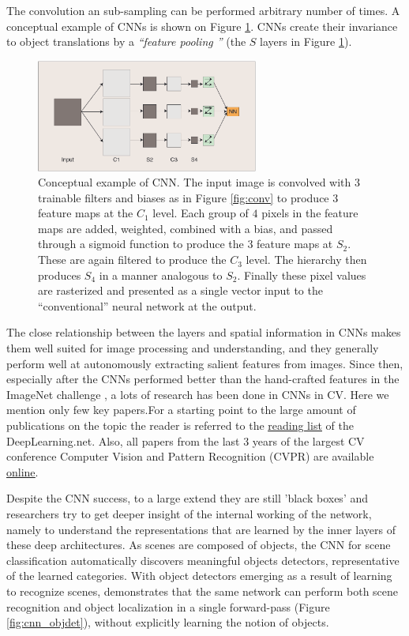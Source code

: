 The convolution an sub-sampling can be performed arbitrary number of times. A conceptual example of CNNs is shown on Figure \ref{fig:cnn}. CNNs create their invariance to object translations by a {\em ``feature pooling ''} (the $S$ layers in Figure \ref{fig:cnn}). 

\begin{figure}[H]
\begin{center}
\includegraphics[width=0.65\textwidth]{fig/cnn}
\end{center}
\caption{Conceptual example of CNN. The input image is convolved with $3$ trainable filters and biases as in Figure \ref{fig:conv} to produce $3$ feature maps at the $C_1$
level. Each group of $4$ pixels in the feature maps are added, weighted, combined with a bias, and passed through a sigmoid function to produce the $3$ feature maps at $S_2$. These are again
filtered to produce the $C_3$ level. The hierarchy then produces $S_4$ in a manner analogous to $S_2$. Finally these pixel values are rasterized and presented as a single vector input to the “conventional” neural network at the output.}
\label{fig:cnn}
\end{figure}

The close relationship between the layers and spatial information in CNNs makes them well suited for image processing and understanding, and they generally perform well at autonomously extracting salient features from images. Since then, especially after the CNNs performed better than the hand-crafted features in the ImageNet challenge \cite{ILSVRC15}, a lots of research has been done in CNNs in CV. 
Here we mention only few key papers.For a starting point to the large amount of publications on the topic the reader is referred to the \href{http://deeplearning.net/reading-list/}{\underline{reading list}} of the DeepLearning.net. Also, all papers from the last $3$ years of the largest CV conference Computer Vision and Pattern Recognition (CVPR)  are available \href{http://www.cv-foundation.org/openaccess/menu.py}{\underline{online}}.

Despite the CNN success, to a large extend they are still 'black boxes' and researchers try to get deeper insight of the internal working of the network, namely to understand
the representations that are learned by the inner layers of these deep architectures. As scenes are composed of objects, the CNN for scene classification
automatically discovers meaningful objects detectors, representative of the learned categories. With object detectors emerging as a result of learning to
recognize scenes,\cite{ZhouKLOT14} demonstrates that the same network can perform both scene recognition and object localization in a single forward-pass (Figure \ref{fig:cnn_objdet}), without
 explicitly learning the notion of objects. 

